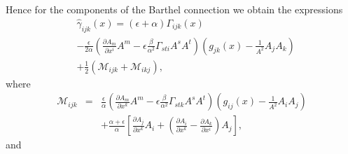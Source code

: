 \documentclass[aps,superscriptaddress, showpacs,preprintnumbers, superscriptaddress, nofootinbibt,twocolumn]{revtex4-2}
\def\bea{\begin{eqnarray}}
\def\eea{\end{eqnarray}}
\begin{document}
Hence for the components of the Barthel connection we obtain the expressions
\begin{equation}\label{eq46}
    \begin{split}
       & \hat{\gamma}_{ijk}(x) =\left( \epsilon +\alpha \right) \Gamma _{ijk}(x)\\
       &-\frac{\epsilon}{2\alpha}\left( \frac{\partial A_m}{\partial x^i}A^m-\epsilon\frac{\beta}{\alpha^2}\Gamma_{sti}A^sA^t
       \right)
       \left( g_{jk}(x)-\frac{1}{A^2}A_jA_k
       \right)\\
       &+ \frac{1}{2}\left(\mathcal{M}_{ijk}+\mathcal{M}_{ikj}\right),
    \end{split}
\end{equation}
where
\bea
        \mathcal{M}_{ijk}&=& \frac{\epsilon}{\alpha}
        \left(\frac{\partial A_m}{\partial x^k}A^m-
        \epsilon\frac{\beta}{\alpha^2}\Gamma_{stk}A^sA^t
        \right)\left( g_{ij}(x)-\frac{1}{A^2}A_iA_j
       \right)
        \nonumber\\
        &&+\frac{\alpha+\epsilon}{\alpha}\left[
        \frac{\partial A_j}{\partial x^k}A_i+
        \left(\frac{\partial A_i}{\partial x^k}-
        \frac{\partial A_k}{\partial x^i}
        \right)A_j
        \right],
\eea
and
\end{document}
